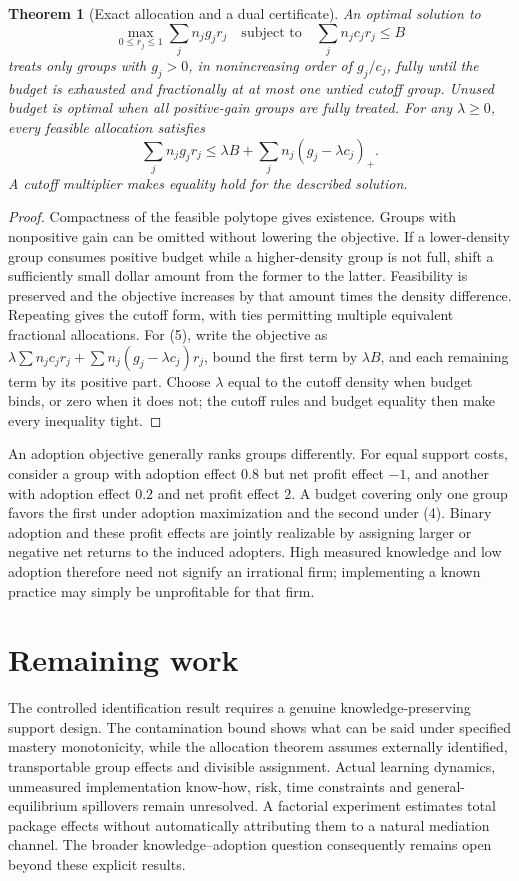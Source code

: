 \documentclass[11pt]{article}
\newtheorem{theorem}{Theorem}
\theoremstyle{definition}
\begin{document}
\begin{theorem}[Exact allocation and a dual certificate]
An optimal solution to
\[
 \max_{0\le r_j\le1}\sum_jn_jg_jr_j
 \quad\text{subject to}\quad\sum_jn_jc_jr_j\le B
 \tag{4}
\]
treats only groups with $g_j>0$, in nonincreasing order of $g_j/c_j$, fully until the budget is exhausted and fractionally at at most one untied cutoff group. Unused budget is optimal when all positive-gain groups are fully treated. For any $\lambda\ge0$, every feasible allocation satisfies
\[
 \sum_jn_jg_jr_j\le\lambda B+\sum_jn_j(g_j-\lambda c_j)_+.
 \tag{5}
\]
A cutoff multiplier makes equality hold for the described solution.
\end{theorem}
\begin{proof}
Compactness of the feasible polytope gives existence. Groups with nonpositive gain can be omitted without lowering the objective. If a lower-density group consumes positive budget while a higher-density group is not full, shift a sufficiently small dollar amount from the former to the latter. Feasibility is preserved and the objective increases by that amount times the density difference. Repeating gives the cutoff form, with ties permitting multiple equivalent fractional allocations. For (5), write the objective as $\lambda\sum n_jc_jr_j+\sum n_j(g_j-\lambda c_j)r_j$, bound the first term by $\lambda B$, and each remaining term by its positive part. Choose $\lambda$ equal to the cutoff density when budget binds, or zero when it does not; the cutoff rules and budget equality then make every inequality tight.
\end{proof}
An adoption objective generally ranks groups differently. For equal support costs, consider a group with adoption effect $0.8$ but net profit effect $-1$, and another with adoption effect $0.2$ and net profit effect $2$. A budget covering only one group favors the first under adoption maximization and the second under (4). Binary adoption and these profit effects are jointly realizable by assigning larger or negative net returns to the induced adopters. High measured knowledge and low adoption therefore need not signify an irrational firm; implementing a known practice may simply be unprofitable for that firm.

\section*{Remaining work}
The controlled identification result requires a genuine knowledge-preserving support design. The contamination bound shows what can be said under specified mastery monotonicity, while the allocation theorem assumes externally identified, transportable group effects and divisible assignment. Actual learning dynamics, unmeasured implementation know-how, risk, time constraints and general-equilibrium spillovers remain unresolved. A factorial experiment estimates total package effects without automatically attributing them to a natural mediation channel. The broader knowledge--adoption question consequently remains open beyond these explicit results.
\end{document}
